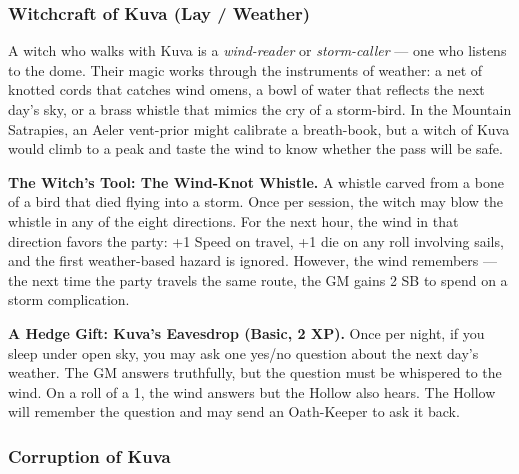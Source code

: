 \subsubsection*{Witchcraft of Kuva (Lay / Weather)}

A witch who walks with Kuva is a \textit{wind-reader} or \textit{storm-caller} --- one who listens to the dome. Their magic works through the instruments of weather: a net of knotted cords that catches wind omens, a bowl of water that reflects the next day's sky, or a brass whistle that mimics the cry of a storm-bird. In the Mountain Satrapies, an Aeler vent-prior might calibrate a breath-book, but a witch of Kuva would climb to a peak and taste the wind to know whether the pass will be safe.

\textbf{The Witch's Tool: The Wind-Knot Whistle.} A whistle carved from a bone of a bird that died flying into a storm. Once per session, the witch may blow the whistle in any of the eight directions. For the next hour, the wind in that direction favors the party: +1 Speed on travel, +1 die on any roll involving sails, and the first weather-based hazard is ignored. However, the wind remembers --- the next time the party travels the same route, the GM gains 2 SB to spend on a storm complication.

\textbf{A Hedge Gift: Kuva's Eavesdrop (Basic, 2 XP).} Once per night, if you sleep under open sky, you may ask one yes/no question about the next day's weather. The GM answers truthfully, but the question must be whispered to the wind. On a roll of a 1, the wind answers but the Hollow also hears. The Hollow will remember the question and may send an Oath-Keeper to ask it back.

\subsubsection*{Corruption of Kuva}


